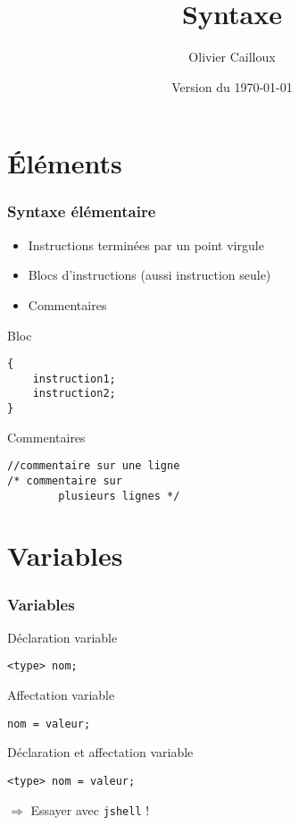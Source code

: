 \documentclass[english, french]{beamer}
\title{Syntaxe}
\author{Olivier Cailloux}
\institute[LAMSADE]{LAMSADE, Université Paris-Dauphine}
\date{Version du \today}
\begin{document}
\begin{frame}[plain]
	\titlepage
\end{frame}
\addtocounter{framenumber}{-1}

\section{Éléments}
\begin{frame}[fragile]
	\frametitle{Syntaxe élémentaire}
	\begin{itemize}
		\item Instructions terminées par un point virgule
		\item Blocs d’instructions {\tiny (aussi instruction seule)}
		\item Commentaires
	\end{itemize}
	\begin{block}{Bloc}
		\begin{lstlisting}
{
	instruction1;
	instruction2;
}
		\end{lstlisting}	
	\end{block}
	\begin{block}{Commentaires}
		\begin{lstlisting}
//commentaire sur une ligne
/* commentaire sur 
        plusieurs lignes */
		\end{lstlisting}
	\end{block}
\end{frame}

\section{Variables}
\begin{frame}[fragile]
	\frametitle{Variables}
	\begin{block}{Déclaration variable}
		\begin{lstlisting}
<type> nom;
		\end{lstlisting}	
	\end{block}
	\begin{block}{Affectation variable}
		\begin{lstlisting}
nom = valeur;
		\end{lstlisting}
	\end{block}
	\begin{block}{Déclaration et affectation variable}
		\begin{lstlisting}
<type> nom = valeur;
		\end{lstlisting}	
	\end{block}
	$⇒$ Essayer avec \texttt{jshell} !
\end{frame}
\end{document}
